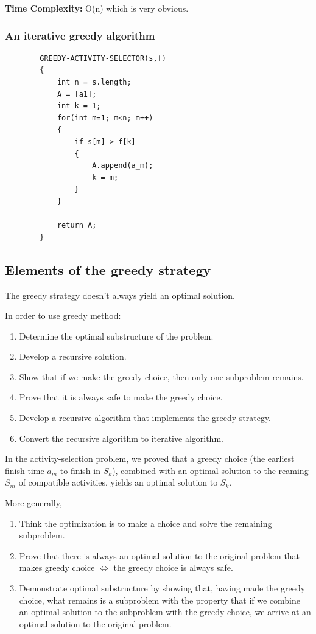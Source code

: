    \textbf{Time Complexity:} O(n) which is very obvious.

\subsubsection*{An iterative greedy algorithm}

    \begin{lstlisting}
        GREEDY-ACTIVITY-SELECTOR(s,f)
        {
            int n = s.length;
            A = [a1];
            int k = 1;
            for(int m=1; m<n; m++)
            {
                if s[m] > f[k]
                {
                    A.append(a_m);
                    k = m;
                }
            }

            return A;
        }
    \end{lstlisting}



\subsection{Elements of the greedy strategy}

    The greedy strategy doesn't always yield an optimal solution.

    In order to use greedy method:
    \begin{enumerate}
        \item Determine the optimal substructure of the problem.
        \item Develop a recursive solution.
        \item Show that if we make the greedy choice, then only one subproblem
        remains.
        \item Prove that it is always safe to make the greedy choice.
        \item Develop a recursive algorithm that implements the greedy strategy.
        \item Convert the recursive algorithm to iterative algorithm.
    \end{enumerate}

    In the activity-selection problem, we proved that a greedy
    choice (the earliest finish time $a_m$ to finish in $S_k$), combined 
    with an optimal solution to the reaming $S_m$ of compatible activities,
    yields an optimal solution to $S_k$.
   
    More generally,
    \begin{enumerate}
        \item Think the optimization is to make a choice and solve the 
        remaining subproblem.
        \item Prove that there is always an optimal solution to the original
        problem that makes greedy choice $\Leftrightarrow$ the greedy
        choice is always safe.
        \item Demonstrate optimal substructure by showing that, having
        made the greedy choice, what remains is a subproblem with the property
        that if we combine an optimal solution to the subproblem with 
        the greedy choice, we arrive at an optimal solution to the original 
        problem.
    \end{enumerate}


